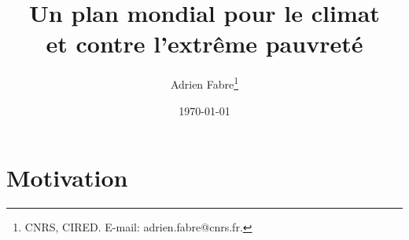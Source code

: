 \documentclass[a5paper,french]{memoir}
\title{Un plan mondial pour le climat \\et contre l'extrême pauvreté}
\author{Adrien Fabre\footnote{CNRS, CIRED. E-mail: adrien.fabre@cnrs.fr.}}
\date{\today}
\begin{document}
\maketitle

\clearpage
\tableofcontents

\chapter*{Motivation}\label{ch:intro}

\end{document}
